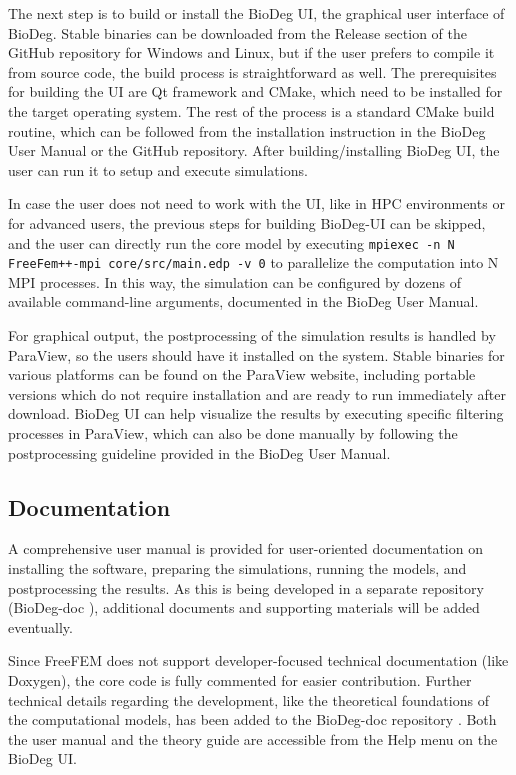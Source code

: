 The next step is to build or install the BioDeg {UI}, the graphical user interface of BioDeg. Stable binaries can be downloaded from the Release section of the GitHub repository for Windows and Linux, but if the user prefers to compile it from source code, the build process is straightforward as well. The prerequisites for building the {UI} are Qt framework and CMake, which need to be installed for the target operating system. The rest of the process is a standard CMake build routine, which can be followed from the installation instruction in the BioDeg User Manual or the GitHub repository. After building/installing BioDeg {UI}, the user can run it to setup and execute simulations.

In case the user does not need to work with the {UI}, like in {HPC} environments or for advanced users, the previous steps for building BioDeg-UI can be skipped, and the user can directly run the core model by executing \texttt{mpiexec -n N FreeFem++-mpi core/src/main.edp -v 0} to parallelize the computation into N {MPI} processes. In this way, the simulation can be configured by dozens of available command-line arguments, documented in the BioDeg User Manual.

For graphical output, the postprocessing of the simulation results is handled by ParaView, so the users should have it installed on the system. Stable binaries for various platforms can be found on the ParaView website, including portable versions which do not require installation and are ready to run immediately after download. BioDeg {UI} can help visualize the results by executing specific filtering processes in ParaView, which can also be done manually by following the postprocessing guideline provided in the BioDeg User Manual.

\subsection{Documentation}

A comprehensive user manual is provided for user-oriented documentation on installing the software, preparing the simulations, running the models, and postprocessing the results. As this is being developed in a separate repository (BioDeg-doc \cite{BioDegDoc}), additional documents and supporting materials will be added eventually.

Since FreeFEM does not support developer-focused technical documentation (like Doxygen), the core code is fully commented for easier contribution. Further technical details regarding the development, like the theoretical foundations of the computational models, has been added to the BioDeg-doc repository \cite{BioDegDoc}. Both the user manual and the theory guide are accessible from the Help menu on the BioDeg {UI}.

